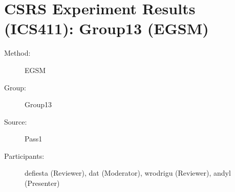 \chapter {CSRS Experiment Results (ICS411): Group13 (EGSM)}
\small
	  

\begin{description}
\item [Method:] EGSM
\item [Group:] Group13
\item [Source:] Pass1
\item [Participants:] defiesta (Reviewer), dat (Moderator), wrodrigu (Reviewer), andyl (Presenter)
\end{description}
